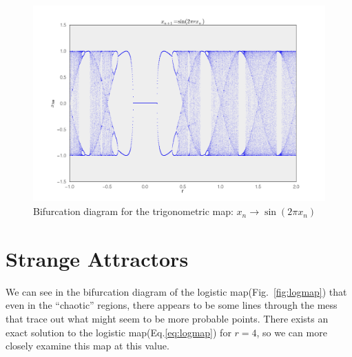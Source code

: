 \documentclass[paper=a4, fontsize=11pt, abstract=on]{scrartcl} %
\numberwithin{equation}{section}
\numberwithin{figure}{section}
\numberwithin{table}{section}
\begin{document}
\begin{figure}[h]
  \centering
  \includegraphics[width=\textwidth]{sin}
  \caption{Bifurcation diagram for the trigonometric map: $x_n \rightarrow \sin (2 \pi x_n)$}
  \label{fig:trig}
\end{figure}

\pagebreak

\section{Strange Attractors}
\label{sec:strng}

We can see in the bifurcation diagram of the logistic
map(Fig.~\ref{fig:logmap}) that even in the ``chaotic'' regions, there
appears to be some lines through the mess that trace out what might
seem to be more probable points. There exists an exact solution to the
logistic map(Eq.\ref{eq:logmap}) for $r=4$, so we can more closely
examine this map at this value. 

\vline
\end{document}
